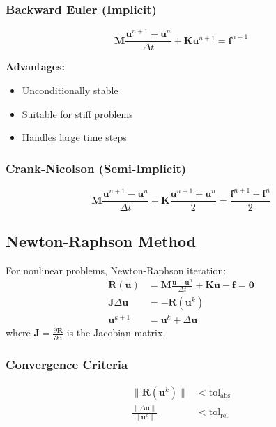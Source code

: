 \documentclass[11pt,a4paper]{article}
\begin{document}
\subsubsection{Backward Euler (Implicit)}
\begin{equation}
\bm{M} \frac{\bm{u}^{n+1} - \bm{u}^n}{\Delta t} + \bm{K} \bm{u}^{n+1} = \bm{f}^{n+1}
\end{equation}

\textbf{Advantages:}
\begin{itemize}
    \item Unconditionally stable
    \item Suitable for stiff problems
    \item Handles large time steps
\end{itemize}

\subsubsection{Crank-Nicolson (Semi-Implicit)}
\begin{equation}
\bm{M} \frac{\bm{u}^{n+1} - \bm{u}^n}{\Delta t} + \bm{K} \frac{\bm{u}^{n+1} + \bm{u}^n}{2} = \frac{\bm{f}^{n+1} + \bm{f}^n}{2}
\end{equation}

\subsection{Newton-Raphson Method}

For nonlinear problems, Newton-Raphson iteration:
\begin{align}
\bm{R}(\bm{u}) &= \bm{M} \frac{\bm{u} - \bm{u}^n}{\Delta t} + \bm{K} \bm{u} - \bm{f} = \bm{0}\\
\bm{J} \Delta \bm{u} &= -\bm{R}(\bm{u}^k)\\
\bm{u}^{k+1} &= \bm{u}^k + \Delta \bm{u}
\end{align}
where $\bm{J} = \frac{\partial \bm{R}}{\partial \bm{u}}$ is the Jacobian matrix.

\subsubsection{Convergence Criteria}
\begin{align}
\|\bm{R}(\bm{u}^k)\| &< \text{tol}_{\text{abs}}\\
\frac{\|\Delta \bm{u}\|}{\|\bm{u}^k\|} &< \text{tol}_{\text{rel}}
\end{align}
\end{document}
